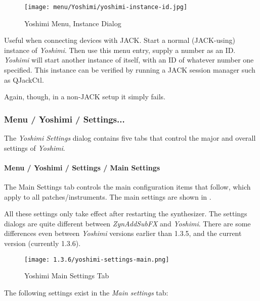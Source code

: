\begin{figure}[H]
   \centering 
   \texttt{[image: menu/Yoshimi/yoshimi-instance-id.jpg]}
   \caption{Yoshimi Menu, Instance Dialog}
   \label{fig:yoshimi_instance_dialog}
\end{figure}

   Useful when connecting devices with JACK.
   Start a normal (JACK-using) instance of \textsl{Yoshimi}.
   Then use this menu entry, supply a number as an ID.
   \textsl{Yoshimi} will start another instance
   of itself, with an ID of whatever number one specified.
   This instance can be verified by running a JACK session manager such as
   QJackCtl.

   Again, though, in a non-JACK setup it simply fails.  

\subsubsection{Menu / Yoshimi / Settings...}
\label{subsubsec:menu_yoshimi_settings}

   The \textsl{Yoshimi Settings} dialog contains five tabs that control the
   major and overall settings of \textsl{Yoshimi}.
   
\paragraph{Menu / Yoshimi / Settings / Main Settings}
\label{paragraph:menu_yoshimi_settings_main_settings}

   The Main Settings tab controls the main configuration items that
   follow, which apply to all patches/instruments.
   The main settings are shown in
   .

   All these settings only take effect after restarting the synthesizer.
   The settings dialogs are quite different between \textsl{ZynAddSubFX} and
   \textsl{Yoshimi}.  There are some differences even between
   \textsl{Yoshimi} versions earlier than 1.3.5, and the current version
   (currently 1.3.6).

\begin{figure}[H]
   \centering 
   \texttt{[image: 1.3.6/yoshimi-settings-main.png]}
   \caption{Yoshimi Main Settings Tab}
   \label{fig:yoshimi_main_settings_dialog}
\end{figure}

   The following settings exist in the \textsl{Main settings} tab:

